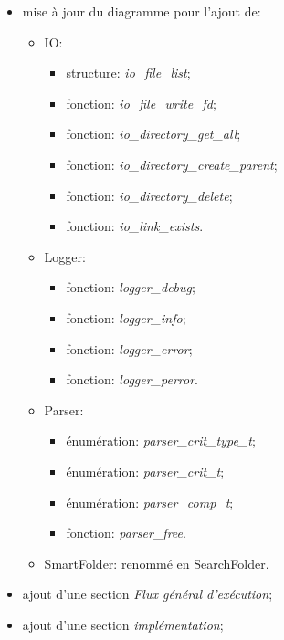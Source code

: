 \documentclass[11pt, a4paper]{article}
\begin{document}
\begin{itemize}
    \item mise à jour du diagramme pour l'ajout de:
    \begin{itemize}
        \item IO:
        \begin{itemize}
            \item structure: \textit{io\_file\_list};
            \item fonction: \textit{io\_file\_write\_fd};
            \item fonction: \textit{io\_directory\_get\_all};
            \item fonction: \textit{io\_directory\_create\_parent};
            \item fonction: \textit{io\_directory\_delete};
            \item fonction: \textit{io\_link\_exists}.
        \end{itemize}
    \end{itemize}
    \begin{itemize}
        \item Logger:
        \begin{itemize}
            \item fonction: \textit{logger\_debug};
            \item fonction: \textit{logger\_info};
            \item fonction: \textit{logger\_error};
            \item fonction: \textit{logger\_perror}.
        \end{itemize}
    \end{itemize}
    \begin{itemize}
        \item Parser:
        \begin{itemize}
            \item énumération: \textit{parser\_crit\_type\_t};
            \item énumération: \textit{parser\_crit\_t};
            \item énumération: \textit{parser\_comp\_t};
            \item fonction: \textit{parser\_free}.
        \end{itemize}
    \end{itemize}
    \begin{itemize}
        \item SmartFolder: renommé en SearchFolder.
    \end{itemize}
    \item ajout d'une section \textit{Flux général d'exécution};
    \item ajout d'une section \textit{implémentation};
\end{itemize}
\end{document}
